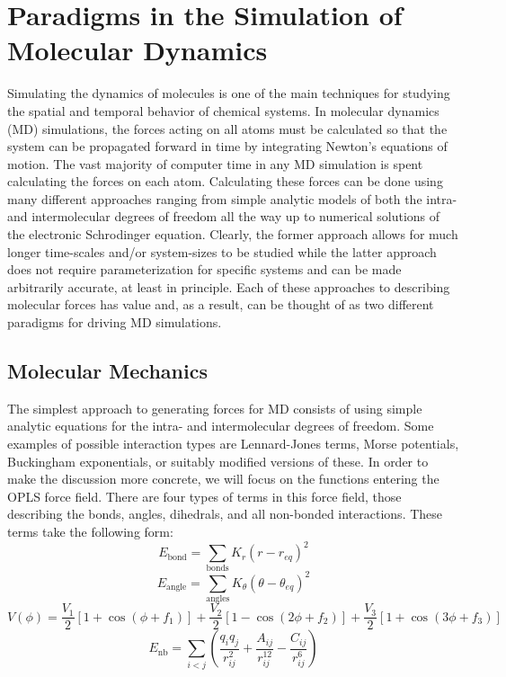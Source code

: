 \documentclass[11pt, proquest]{uwthesis}[2020/02/24]
\begin{document}
\chapter{Paradigms in the Simulation of Molecular Dynamics}

Simulating the dynamics of molecules is one of the main techniques for studying the spatial and temporal behavior of chemical systems. In molecular dynamics (MD) simulations, the forces acting on all atoms must be calculated so that the system can be propagated forward in time by integrating Newton's equations of motion. The vast majority of computer time in any MD simulation is spent calculating the forces on each atom. Calculating these forces can be done using many different approaches ranging from simple analytic models of both the intra- and intermolecular degrees of freedom all the way up to numerical solutions of the electronic Schrodinger equation. Clearly, the former approach allows for much longer time-scales and/or system-sizes to be studied while the latter approach does not require parameterization for specific systems and can be made arbitrarily accurate, at least in principle. Each of these approaches to describing molecular forces has value and, as a result, can be thought of as two different paradigms for driving MD simulations.

\section{Molecular Mechanics}

The simplest approach to generating forces for MD consists of using simple analytic equations for the intra- and intermolecular degrees of freedom. Some examples of possible interaction types are Lennard-Jones terms, Morse potentials\autocite{morse_diatomic_1929}, Buckingham exponentials\autocite{buckingham_classical_1938}, or suitably modified versions of these\autocite{werhahn_new_2015}. In order to make the discussion more concrete, we will focus on the functions entering the OPLS force field\autocite{damm_opls_1997}. There are four types of terms in this force field, those describing the bonds, angles, dihedrals, and all non-bonded interactions. These terms take the following form:
\begin{equation}
    E_{\mathrm{bond}}=\sum_{\mathrm{bonds}}K_r(r-r_{eq})^2
\end{equation}
\begin{equation}
    E_{\mathrm{angle}}=\sum_{\mathrm{angles}}K_\theta(\theta-\theta_{eq})^2
\end{equation}
\begin{equation}
    V(\phi)=\frac{V_1}{2}[1+\cos(\phi+f_1)] + \frac{V_2}{2}[1-\cos(2\phi+f_2)] + \frac{V_3}{2}[1+\cos(3\phi+f_3)]
\end{equation}
\begin{equation}
    E_{\mathrm{nb}}=\sum_{i<j}\left(\frac{q_iq_j}{r_{ij}^2}+\frac{A_{ij}}{r_{ij}^{12}}-\frac{C_{ij}}{r_{ij}^6}\right)
\end{equation}
\end{document}
